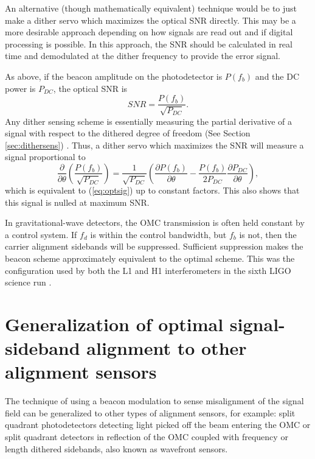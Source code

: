 An alternative (though mathematically equivalent) technique would be to just make a dither servo which maximizes the optical SNR directly. %
This may be a more desirable approach depending on how signals are read out and if digital processing is possible. %
In this approach, the SNR should be calculated in real time and demodulated at the dither frequency to provide the error signal.

As above, if the beacon amplitude on the photodetector is $P(f_b)$ and the DC power is $P_{DC}$, the optical SNR is
%
\begin{equation}
SNR = \frac{P(f_b)}{\sqrt{P_{DC}}}.
\end{equation}
%
Any dither sensing scheme is essentially measuring the partial derivative of a signal with respect to the dithered degree of freedom (See Section \ref{sec:dithersens}) \cite{Kawabe:94}. %
Thus, a dither servo which maximizes the SNR will measure a signal proportional to
%
\begin{equation}
\frac{\partial}{\partial \theta} \left( \frac{P(f_b)}{\sqrt {P_{DC}} } \right) = \frac{1}{\sqrt {P_{DC}}} \left( \frac{\partial P(f_b)}{\partial \theta} - \frac{P(f_b)}{2P_{DC}} \frac{\partial P_{DC}}{\partial \theta} \right),
\end{equation}
%
which is equivalent to (\ref{eq:optsig}) up to constant factors. %
This also shows that this signal is nulled at maximum SNR.

In gravitational-wave detectors, the OMC transmission is often held constant by a control system. %
If $f_d$ is within the control bandwidth, but $f_b$ is not, then the carrier alignment sidebands will be suppressed. %
Sufficient suppression makes the beacon scheme approximately equivalent to the optimal scheme. %
This was the configuration used by both the L1 and H1 interferometers in the sixth LIGO science run \cite{Tobin}.

\section{Generalization of optimal signal-sideband alignment to other alignment sensors}

The technique of using a beacon modulation to sense misalignment of the signal field can be generalized to other types of alignment sensors, for example: split quadrant photodetectors detecting light picked off the beam entering the OMC or split quadrant detectors in reflection of the OMC coupled with frequency or length dithered sidebands, also known as wavefront sensors.


